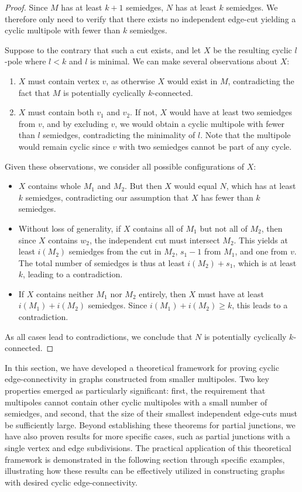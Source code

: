 \documentclass[12pt, twoside]{book}
\begin{document}
\begin{proof}
	Since $M$ has at least $k+1$ semiedges, $N$ has at least $k$ semiedges. We therefore only need to verify that there exists no independent edge-cut yielding a cyclic multipole with fewer than $k$ semiedges.
	
	Suppose to the contrary that such a cut exists, and let $X$ be the resulting cyclic $l$-pole where $l<k$ and $l$ is minimal. We can make several observations about $X$:
	\begin{enumerate}[label=(\roman*)]
		\item $X$ must contain vertex $v$, as otherwise $X$ would exist in $M$, contradicting the fact that $M$ is potentially cyclically $k$-connected.
		\item $X$ must contain both $v_1$ and $v_2$. If not, $X$ would have at least two semiedges from $v$, and by excluding $v$, we would obtain a cyclic multipole with fewer than $l$ semiedges, contradicting the minimality of $l$. Note that the multipole would remain cyclic since $v$ with two semiedges cannot be part of any cycle.
	\end{enumerate}
	
	Given these observations, we consider all possible configurations of $X$:
	\begin{itemize}
		\item $X$ contains whole $M_1$ and $M_2$. But then $X$ would equal $N$, which has at least $k$ semiedges, contradicting our assumption that $X$ has fewer than $k$ semiedges.
		\item Without loss of generality, if $X$ contains all of $M_1$ but not all of $M_2$, then since $X$ contains $w_2$, the independent cut must intersect $M_2$. This yields at least $i(M_2)$ semiedges from the cut in $M_2$, $s_1-1$ from $M_1$, and one from $v$. The total number of semiedges is thus at least $i(M_2)+s_1$, which is at least $k$, leading to a contradiction.
		\item If $X$ contains neither $M_1$ nor $M_2$ entirely, then $X$ must have at least $i(M_1)+i(M_2)$ semiedges. Since $i(M_1)+i(M_2)\geq k$, this leads to a contradiction.
	\end{itemize}

	As all cases lead to contradictions, we conclude that $N$ is potentially cyclically $k$-connected.
\end{proof}

In this section, we have developed a theoretical framework for proving cyclic \mbox{edge-connectivity} in graphs constructed from smaller multipoles. Two key properties emerged as particularly significant: first, the requirement that multipoles cannot contain other cyclic multipoles with a small number of semiedges, and second, that the size of their smallest independent edge-cuts must be sufficiently large. Beyond establishing these theorems for partial junctions, we have also proven results for more specific cases, such as partial junctions with a single vertex and edge subdivisions. The practical application of this theoretical framework is demonstrated in the following section through specific examples, illustrating how these results can be effectively utilized in constructing graphs with desired cyclic edge-connectivity.
\end{document}
